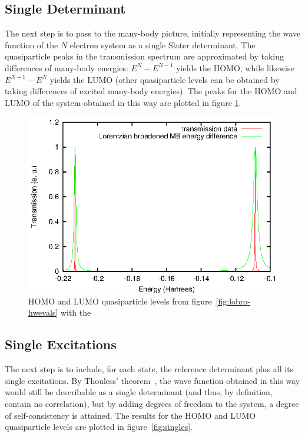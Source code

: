 \subsection{Single Determinant}
\label{subsec:SingleDeterminant}

The next step is to pass to the many-body picture, initially representing the
wave function of the $N$ electron system as a single Slater determinant. The
quasiparticle peaks in the transmission spectrum are approximated by taking
differences of many-body energies: $E^N - E^{N-1}$ yields the \ac{HOMO}, while
likewise $E^{N+1} - E^N$ yields the \ac{LUMO} (other quasiparticle levels can be
obtained by taking differences of excited many-body energies). The peaks for
the \ac{HOMO} and \ac{LUMO} of the system obtained in this way are plotted in figure
\ref{fig:nobranch}.

\begin{figure}
	\begin{center}
		\includegraphics[width=0.9\linewidth]{figures/nobranch}
	\end{center}
	\caption{\ac{HOMO} and \ac{LUMO} quasiparticle levels from
	figure~\ref{fig:lobro-hwevals} with the }
	\label{fig:nobranch}
\end{figure}

\subsection{Single Excitations}
\label{subsec:singles}

The next step is to include, for each state, the reference determinant plus all
its single excitations. By Thouless' theorem~\cite{Thouless}, the wave function
obtained in this way would still be describable as a single determinant (and
thus, by definition, contain no correlation), but by adding degrees of freedom
to the system, a degree of self-consistency is attained. The results for the
\ac{HOMO} and \ac{LUMO} quasiparticle levels are plotted in
figure~\ref{fig:singles}.

